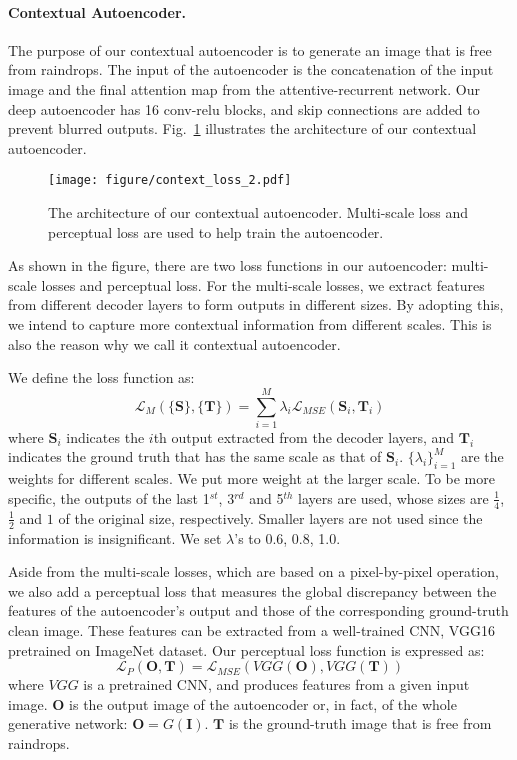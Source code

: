 \documentclass[10pt,twocolumn,letterpaper]{article}
\begin{document}
\paragraph{Contextual Autoencoder.}
The purpose of our contextual autoencoder is to generate an image that is free from raindrops. The input of the autoencoder is the concatenation of the input image and the final attention map from the attentive-recurrent network. Our deep autoencoder has 16 conv-relu blocks, and skip connections are added to prevent  blurred outputs. Fig.~\ref{fig_4} illustrates the architecture of our contextual autoencoder.

\begin{figure}
	\begin{center}
		\texttt{[image: figure/context\_loss\_2.pdf]}
	\end{center}
	\caption{The architecture of our contextual autoencoder. Multi-scale loss and perceptual loss are used to help train the autoencoder.}
	\label{fig_4}
\end{figure}

As shown in the figure, there are two loss functions in our autoencoder:  multi-scale losses and perceptual loss. For the multi-scale losses, we extract features from different decoder layers  to form outputs in different sizes. By adopting this, we intend to capture more contextual information from different scales. This is also the reason why we call it contextual autoencoder. 

We define the loss function as:
\begin{equation}
\mathcal{L}_M(\{\mathbf{S}\}, \{\mathbf{T}\}) = \sum\limits^M_{i = 1}\lambda_i \mathcal{L}_{MSE}(\mathbf{S}_i, \mathbf{T}_{i})
\end{equation}
where $\mathbf{S}_i$ indicates the $i$th output extracted from the decoder layers, and $\mathbf{T}_{i}$ indicates the ground truth that has the same scale as that of $\mathbf{S}_i$. ${\{\lambda_i\}}_{i=1}^M$ are the weights for different scales. We put more weight at the larger scale. 
To be more specific, the outputs of the last 1$^{st}$, 3$^{rd}$ and 5$^{th}$ layers are used, whose sizes are $\frac{1}{4}$, $\frac{1}{2}$ and $1$  of the  original size, respectively. Smaller layers are not used since the information is insignificant. We set $\lambda$'s to 0.6, 0.8, 1.0.

Aside from the multi-scale losses, which are based on a pixel-by-pixel operation, we also add a perceptual loss \cite{johnson2016perceptual} that measures the global discrepancy between the features of the autoencoder's output and those of the corresponding ground-truth clean image. These features can be   extracted from a well-trained CNN, \eg VGG16 pretrained on ImageNet dataset. Our perceptual loss function is expressed as:
\begin{equation}
\mathcal{L}_P(\mathbf{O},\mathbf{T}) = \mathcal{L}_{MSE}(VGG(\mathbf{O}), VGG(\mathbf{T}))
\end{equation}	
where $VGG$ is a pretrained CNN, and produces features from a given input image. 
$\mathbf{O}$ is the output image of the autoencoder or, in fact, of the whole generative network: $\mathbf{O} = G(\mathbf{I})$.  $\mathbf{T}$ is the ground-truth image that is free from raindrops.
\end{document}
